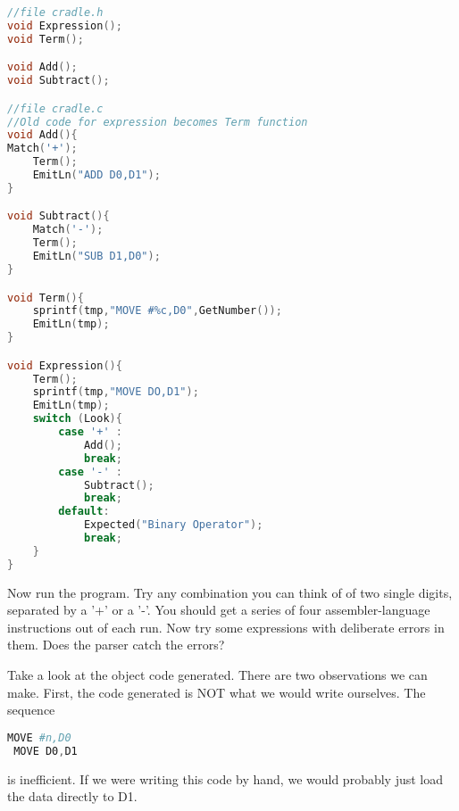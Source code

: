 \begin{lstlisting}[language=C]
//file cradle.h
void Expression();
void Term();

void Add();
void Subtract();

//file cradle.c
//Old code for expression becomes Term function
void Add(){
Match('+');
	Term();
	EmitLn("ADD D0,D1");
}

void Subtract(){
	Match('-');
	Term();
	EmitLn("SUB D1,D0");
}

void Term(){
	sprintf(tmp,"MOVE #%c,D0",GetNumber()); 
	EmitLn(tmp); 
}

void Expression(){
	Term();	
	sprintf(tmp,"MOVE DO,D1");
	EmitLn(tmp);
	switch (Look){
		case '+' :
			Add();
			break;
		case '-' :
			Subtract();
			break;	
		default:
			Expected("Binary Operator");
			break;		
	}
}
\end{lstlisting}
Now run the program. Try any combination you can think of of two
single digits, separated by a '+' or a '-'. You should get a
series of four assembler-language instructions out of each run.
Now try some expressions with deliberate errors in them. Does
the parser catch the errors?

Take a look at the object code generated. There are two
observations we can make. First, the code generated is NOT what
we would write ourselves. The sequence

\begin{lstlisting}[language=Assembler]
 MOVE #n,D0
 MOVE D0,D1
\end{lstlisting}
is inefficient. If we were writing this code by hand, we would
probably just load the data directly to D1.

